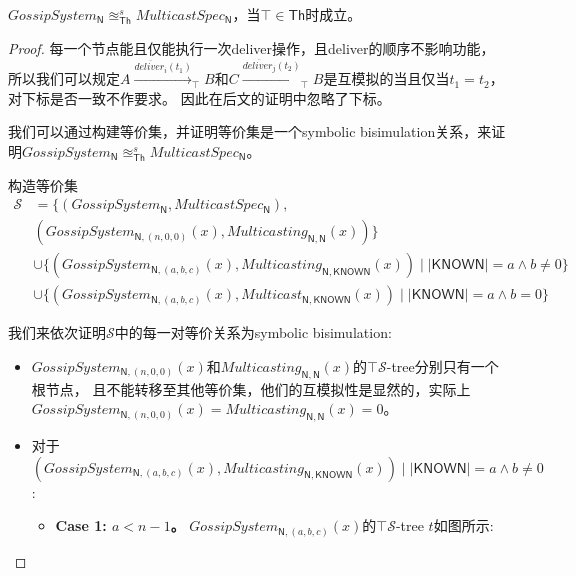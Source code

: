\begin{theorem}
    $GossipSystem_{\mathsf{N}} \approxeq^s_{\mathsf{Th}} MulticastSpec_{\mathsf{N}}$，当$\top \in \mathsf{Th}$时成立。
\end{theorem}
\begin{proof}
每一个节点能且仅能执行一次deliver操作，且deliver的顺序不影响功能，
所以我们可以规定$A\stackrel{\overline{deliver_i}(t_1)}{\longrightarrow}_{\top} B$和$C\stackrel{\overline{deliver_j}(t_2)}{\longrightarrow}_{\top}B$是互模拟的当且仅当$t_1=t_2$，对下标是否一致不作要求。
因此在后文的证明中忽略了下标。

我们可以通过构建等价集，并证明等价集是一个symbolic bisimulation关系，来证明$GossipSystem_{\mathsf{N}} \approxeq^s_{\mathsf{Th}} MulticastSpec_{\mathsf{N}}$。

构造等价集
\begin{align*}
   \mathcal{S}&=\{(GossipSystem_{\mathsf{N}}, MulticastSpec_{\mathsf{N}}), \\
      &(GossipSystem_{\mathsf{N},(n,0,0)}(x), Multicasting_{\mathsf{N},\mathsf{N}}(x))\}\\
      & \cup \{(GossipSystem_{\mathsf{N},(a,b,c)}(x), Multicasting_{\mathsf{N}, \mathsf{KNOWN}}(x))\mid |\mathsf{KNOWN}| = a \wedge b\neq 0\}\\
      &\cup \{(GossipSystem_{\mathsf{N},(a,b,c)}(x), Multicast_{\mathsf{N}, \mathsf{KNOWN}}(x))\mid |\mathsf{KNOWN}| = a \wedge b= 0\}
\end{align*}

我们来依次证明$\mathcal{S}$中的每一对等价关系为symbolic bisimulation:
\begin{itemize}
    \item {
       $GossipSystem_{\mathsf{N},(n,0,0)}(x)$和$Multicasting_{\mathsf{N},\mathsf{N}}(x)$的$\top \mathcal{S}$-tree分别只有一个根节点，
       且不能转移至其他等价集，他们的互模拟性是显然的，实际上$GossipSystem_{\mathsf{N},(n,0,0)}(x)=Multicasting_{\mathsf{N},\mathsf{N}}(x)=0$。
    }
    \item {
        对于$(GossipSystem_{\mathsf{N},(a,b,c)}(x), Multicasting_{\mathsf{N}, \mathsf{KNOWN}}(x))\mid |\mathsf{KNOWN}| = a \wedge b\neq 0$:

        \begin{itemize}
            \item {\textbf{Case 1: $a<n-1$。}
            $GossipSystem_{\mathsf{N},(a,b,c)}(x)$的$\top \mathcal{S}$-tree $t$如图所示:

}
\end{itemize}}
\end{itemize}
\end{proof}
